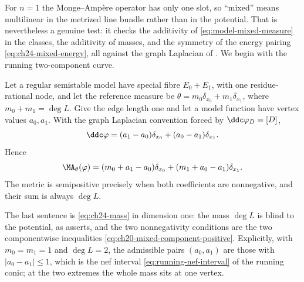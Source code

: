 For $n=1$ the Monge--Amp\`ere operator has only one slot, so ``mixed''
means multilinear in the metrized line bundle rather than in the potential.
That is nevertheless a genuine test: it checks the additivity of
\eqref{eq:model-mixed-measure} in the classes, the additivity of masses, and
the symmetry of the energy pairing \eqref{eq:ch24-mixed-energy}, all against
the graph Laplacian of .  We begin with the
running two-component curve.

\begin{example}
\label{ex:two-vertex-ma}
Let a regular semistable model have special fibre $E_0+E_1$, with one
residue-rational node, and let the reference measure be
$\theta=m_0\delta_{x_0}+m_1\delta_{x_1}$, where
$m_0+m_1=\deg L$. Give the edge length one and let a model function have
vertex values $a_0,a_1$. With the graph Laplacian convention forced by
$\ddc\varphi_D=[D]$,
\[
 \ddc\varphi=(a_1-a_0)\delta_{x_0}+(a_0-a_1)\delta_{x_1}.
\]
Hence
\[
 \MA_\theta(\varphi)
 =(m_0+a_1-a_0)\delta_{x_0}
 +(m_1+a_0-a_1)\delta_{x_1}.
\]
The metric is semipositive precisely when both coefficients are nonnegative,
and their sum is always $\deg L$.
\end{example}

The last sentence is \eqref{eq:ch24-mass} in dimension one: the mass
$\deg L$ is blind to the potential, as
 asserts, and the two nonnegativity
conditions are the two componentwise inequalities
\eqref{eq:ch20-mixed-component-positive}.  Explicitly, with
$m_0=m_1=1$ and $\deg L=2$, the admissible pairs $(a_0,a_1)$ are those
with $|a_0-a_1|\leq1$, which is the nef interval
\eqref{eq:running-nef-interval} of the running conic; at the two extremes the
whole mass sits at one vertex.

